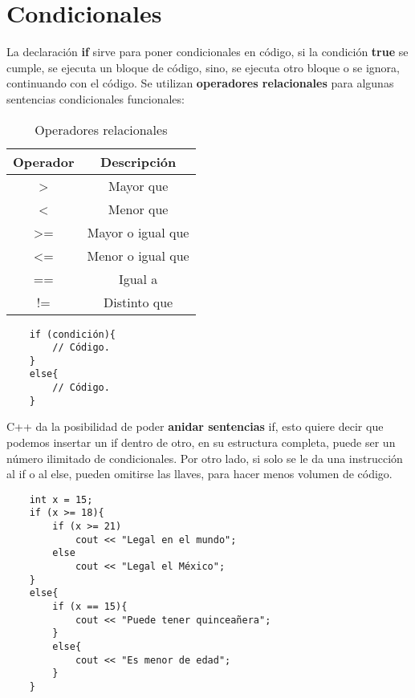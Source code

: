 \section{Condicionales}

La declaración \textbf{if} sirve para poner condicionales en código, si la condición \textbf{true} se cumple, se ejecuta un bloque de código, sino, se ejecuta otro bloque o se ignora, continuando con el código. Se utilizan \textbf{operadores relacionales} para algunas sentencias condicionales funcionales:
\begin{table}[H]
    \begin{center}
        \caption{Operadores relacionales}
        \label{tab: 3}
        \begin{tabular}{c c}
            \hline
            \textbf{Operador}&\textbf{Descripción} \\
            \hline
            \textgreater    & Mayor que \\
            \textless       & Menor que \\
            \textgreater =  & Mayor o igual que \\
            \textless =     & Menor o igual que \\
            ==              & Igual a \\
            !=              & Distinto que \\
            \hline
        \end{tabular}
    \end{center}
\end{table}
\begin{lstlisting}
    if (condición){
        // Código.
    }
    else{
        // Código.
    }
\end{lstlisting}

C++ da la posibilidad de poder \textbf{anidar sentencias} if, esto quiere decir que podemos insertar un if dentro de otro, en su estructura completa, puede ser un número ilimitado de condicionales. Por otro lado, si solo se le da una instrucción al if o al else, pueden omitirse las llaves, para hacer menos volumen de código.
\begin{lstlisting}
    int x = 15;
    if (x >= 18){
        if (x >= 21)
            cout << "Legal en el mundo";
        else
            cout << "Legal el México";
    }
    else{
        if (x == 15){
            cout << "Puede tener quinceañera";
        }
        else{
            cout << "Es menor de edad";
        }
    }
\end{lstlisting}

